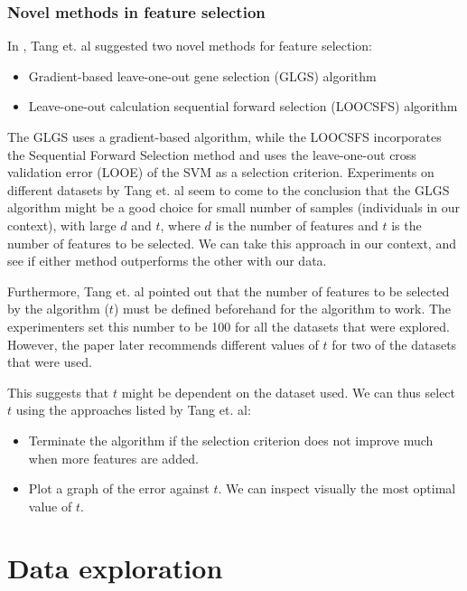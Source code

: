 \documentclass[12pt, twoside, a4paper]{report}
\begin{document}
\subsection{Novel methods in feature selection} \label{bg_GLGS}
In \cite{RefWorks:119}, Tang et. al suggested two novel methods for feature selection:
\begin{itemize}
\item Gradient-based leave-one-out gene selection (GLGS) algorithm
\item Leave-one-out calculation sequential forward selection (LOOCSFS) algorithm
\end{itemize}

The GLGS uses a gradient-based algorithm, while the LOOCSFS incorporates the Sequential Forward Selection method and uses the leave-one-out cross validation error (LOOE) of the SVM as a selection criterion. Experiments on different datasets by Tang et. al seem to come to the conclusion that the GLGS algorithm might be a good choice for small number of samples (individuals in our context), with large $d$ and $t$, where $d$ is the number of features and $t$ is the number of features to be selected. We can take this approach in our context, and see if either method outperforms the other with our data.

Furthermore, Tang et. al pointed out that the number of features to be selected by the algorithm ($t$) must be defined beforehand for the algorithm to work. The experimenters set this number to be 100 for all the datasets that were explored. However, the paper later recommends different values of $t$ for two of the datasets that were used.

This suggests that $t$ might be dependent on the dataset used. We can thus select $t$ using the approaches listed by Tang et. al:
\begin{itemize}
\item Terminate the algorithm if the selection criterion does not improve much when more features are added.
\item Plot a graph of the error against $t$. We can inspect visually the most optimal value of $t$.
\end{itemize}

\chapter{Data exploration}
\end{document}
